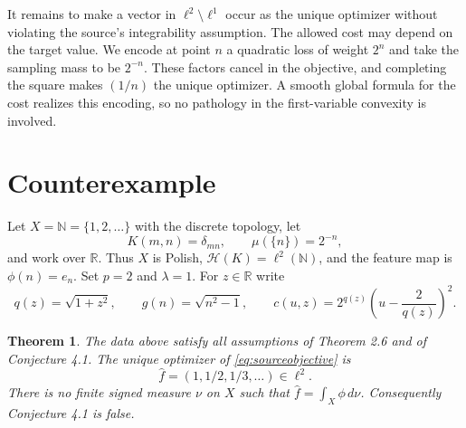\documentclass[11pt]{article}
\newtheorem{theorem}{Theorem}
\newcommand{\N}{\mathbb N}
\newcommand{\R}{\mathbb R}
\newcommand{\Hcal}{\mathcal H}
\begin{document}
It remains to make a vector in $\ell^2\setminus\ell^1$ occur as the unique
optimizer without violating the source's integrability assumption.  The
allowed cost may depend on the target value.  We encode at point $n$ a
quadratic loss of weight $2^n$ and take the sampling mass to be $2^{-n}$.
These factors cancel in the objective, and completing the square makes
$(1/n)$ the unique optimizer.  A smooth global formula for the cost realizes
this encoding, so no pathology in the first-variable convexity is involved.

\section*{Counterexample}

Let $X=\N=\{1,2,\ldots\}$ with the discrete topology, let
\[
 K(m,n)=\delta_{mn},\qquad \mu(\{n\})=2^{-n},
\]
and work over $\R$.  Thus $X$ is Polish,
$\Hcal(K)=\ell^2(\N)$, and the feature map is $\phi(n)=e_n$.
Set $p=2$ and $\lambda=1$.  For $z\in\R$ write
\[
 q(z)=\sqrt{1+z^2},\qquad
 g(n)=\sqrt{n^2-1},\qquad
 c(u,z)=2^{q(z)}\left(u-\frac{2}{q(z)}\right)^2.
\]

\begin{theorem}\label{thm:main}
The data above satisfy all assumptions of Theorem 2.6 and of Conjecture 4.1.
The unique optimizer of \eqref{eq:sourceobjective} is
\[
 \hat f=(1,1/2,1/3,\ldots)\in\ell^2.
\]
There is no finite signed measure $\nu$ on $X$ such that
$\hat f=\int_X\phi\,d\nu$.  Consequently Conjecture 4.1 is false.
\end{theorem}
\end{document}

